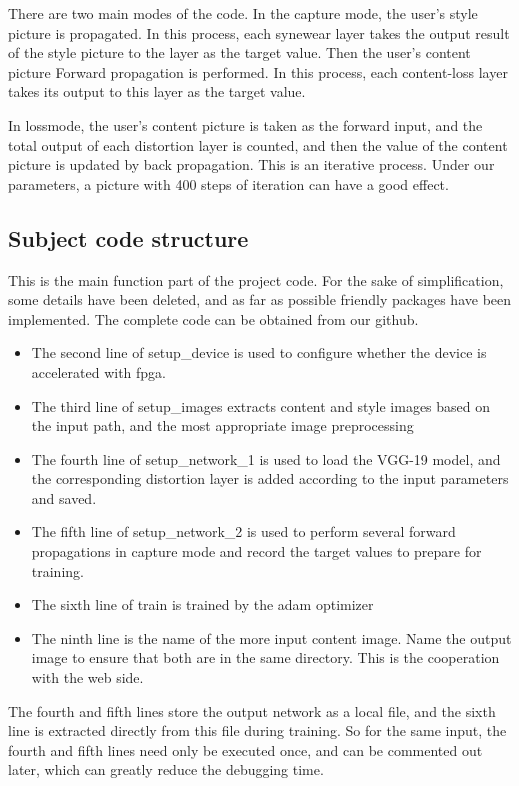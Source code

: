 There are two main modes of the code. In the capture mode, the user's style picture is propagated. In this process, each synewear layer takes the output result of the style picture to the layer as the target value. Then the user's content picture Forward propagation is performed. In this process, each content-loss layer takes its output to this layer as the target value.

In lossmode, the user's content picture is taken as the forward input, and the total output of each distortion layer is counted, and then the value of the content picture is updated by back propagation.
This is an iterative process. Under our parameters, a picture with 400 steps of iteration can have a good effect.

\subsection{Subject code structure}
This is the main function part of the project code. For the sake of simplification, some details have been deleted, and as far as possible friendly packages have been implemented. The complete code can be obtained from our github.\cite{neural-style-diy}
\begin{itemize}
\item The second line of setup\_device is used to configure whether the device is accelerated with fpga.
\item The third line of setup\_images extracts content and style images based on the input path, and the most appropriate image preprocessing
\item The fourth line of setup\_network\_1 is used to load the VGG-19 model, and the corresponding distortion layer is added according to the input parameters and saved.
\item The fifth line of setup\_network\_2 is used to perform several forward propagations in capture mode and record the target values to prepare for training.
\item The sixth line of train is trained by the adam optimizer
\item The ninth line is the name of the more input content image. Name the output image to ensure that both are in the same directory. This is the cooperation with the web side.
\end{itemize}
The fourth and fifth lines store the output network as a local file, and the sixth line is extracted directly from this file during training.
So for the same input, the fourth and fifth lines need only be executed once, and can be commented out later, which can greatly reduce the debugging time.
